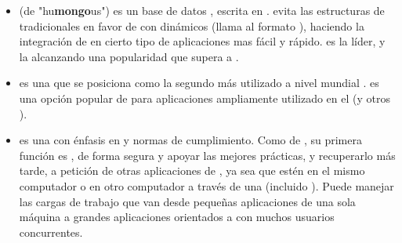 	\begin{itemize}
		\item
			\textbf{\mongodbNAME} (de "hu\textbf{mongo}us") es un base de datos \documentOriented \openSourcePC, escrita en \cPlusPlus \cite{technology_mongodb}. \mongodbNAME evita las estructuras de \dataBaseDB tradicionales \tableBasedDB en favor de \documentsDB \jsonLikeCPT con \schemasDB dinámicos (\mongodbNAME llama al formato \bsonNAME), haciendo la integración de \dataPC en cierto tipo de aplicaciones mas fácil y rápido. \mongodbNAME es la \nosqlNAME líder, y la alcanzando una popularidad que supera a \postgresql \cite{online_db_engines_ranking}.
	
		\item
			\textbf{\mysqlNAME} es una \rdbms \openSourcePC que se posiciona como la  segundo más utilizado a nivel mundial \cite{online_db_engines_ranking}\cite{online_dispelling_myths}. \mysqlNAME es una opción popular de \dataBaseDB para aplicaciones \webINT ampliamente utilizado en el \stackAS \lampNAME (y otros \stacksAS  \ampNAME).
	
		\item
			\textbf{\postgresql} es una \ordbms con énfasis en \extensibilityQA y normas de cumplimiento. Como \serverAS de \dataBaseDB, su primera función es \store \dataPC, de forma segura y apoyar las mejores prácticas, y recuperarlo más tarde, a petición de otras aplicaciones de \softwarePC, ya sea que estén \running en el mismo computador o \running en otro computador a través  de una \networkINT (incluido \internet). Puede manejar las cargas de trabajo que van desde pequeñas aplicaciones de una sola máquina a grandes aplicaciones orientados a \internet con muchos usuarios concurrentes.
	

\end{itemize}

